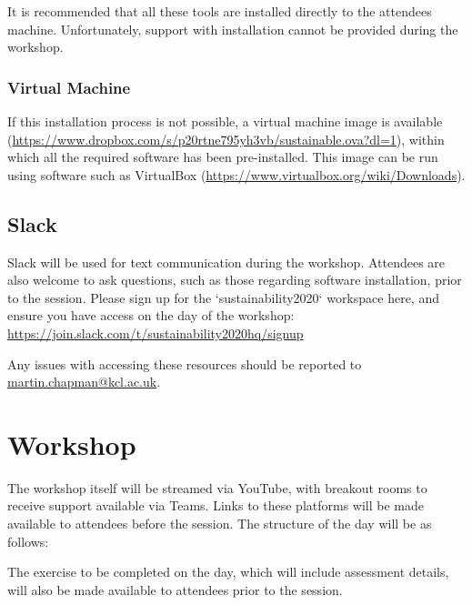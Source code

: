 \documentclass{article}
\begin{document}
It is recommended that all these tools are installed directly to the
attendees machine. Unfortunately, support with installation cannot be
provided during the workshop.

\subsubsection{Virtual Machine}

If this installation process is
not possible, a virtual machine image is available
(\href{https://www.dropbox.com/s/p20rtne795yh3vb/sustainable.ova?dl=1}{https://www.dropbox.com/s/p20rtne795yh3vb/sustainable.ova?dl=1}),
within which all the required software has been pre-installed. This
image can be run using software such as VirtualBox
(\href{https://www.virtualbox.org/wiki/Downloads}{https://www.virtualbox.org/wiki/Downloads}).

\subsection{Slack}

Slack will be used for text communication during the
workshop. Attendees are also welcome to ask questions, such as
those regarding software installation, prior to the session. Please
sign up for the `sustainability2020` workspace here, and
ensure you have access on the day of the workshop: \newline
\href{https://join.slack.com/t/sustainability2020hq/signup}{https://join.slack.com/t/sustainability2020hq/signup}

Any issues with accessing these resources should be reported to
\href{mailto:martin.chapman@kcl.ac.uk}{martin.chapman@kcl.ac.uk}.

\section{Workshop}

The workshop itself will be streamed via YouTube, with breakout rooms
to receive support available via Teams. Links to these platforms will
be made available to attendees before the session. The structure of the
day will be as follows:

\begin{table}[h!]

    \centering 
    
    
    
\end{table}

The exercise to be completed on the day, which will include assessment
details, will also be made available to attendees prior to the session.
\end{document}
